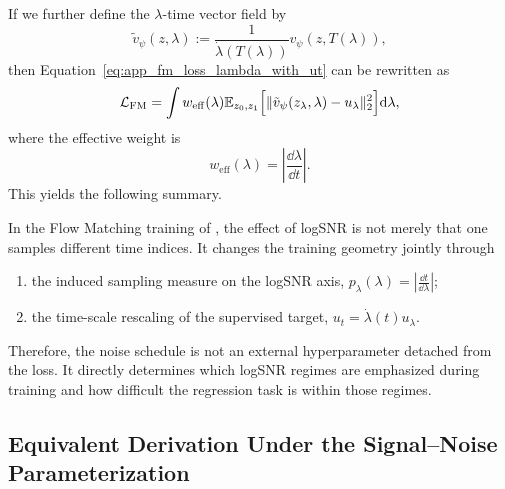 If we further define the $\lambda$-time vector field by
\begin{equation}
\tilde v_{\psi}(z,\lambda)
:=
\frac{1}{\dot\lambda(T(\lambda))}
 v_{\psi}(z,T(\lambda)),
\label{eq:app_vtilde_lambda}
\end{equation}
then Equation~\eqref{eq:app_fm_loss_lambda_with_ut} can be rewritten as
\begin{equation}
\mathcal{L}_{\mathrm{FM}}
=
\int
w_{\mathrm{eff}}(\lambda)
\mathbb{E}_{z_0,z_1}
\Big[
\|\tilde v_{\psi}(z_{\lambda},\lambda)-u_{\lambda}\|_2^2
\Big]
\mathrm{d} \lambda,
\label{eq:app_fm_loss_lambda_weighted}
\end{equation}
where the effective weight is
\begin{equation}
w_{\mathrm{eff}}(\lambda)
=
\left|\frac{\dd \lambda}{\dd t}\right|.
\label{eq:app_effective_weight_lambda}
\end{equation}
This yields the following summary.

\begin{remark}
\label{rem:app_logsnr_enters_fm}
In the Flow Matching training of \method, the effect of logSNR is not merely that one samples different time indices. It changes the training geometry jointly through
\begin{enumerate}
    \item the induced sampling measure on the logSNR axis, $p_{\lambda}(\lambda)=\left|\frac{\dd t}{\dd \lambda}\right|$;
    \item the time-scale rescaling of the supervised target, $u_t=\dot\lambda(t)u_{\lambda}$.
\end{enumerate}
Therefore, the noise schedule is not an external hyperparameter detached from the loss. It directly determines which logSNR regimes are emphasized during training and how difficult the regression task is within those regimes.
\end{remark}

\subsection{Equivalent Derivation Under the Signal--Noise Parameterization}
\label{app:signal_noise_parametrization}

